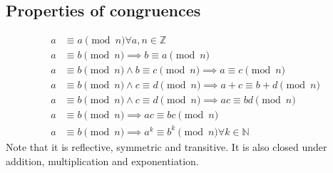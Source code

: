 \documentclass[letterpaper,12pt,oneside]{article}
\begin{document}
\subsection{Properties of congruences}
\begin{align*}
    a & \equiv a \pmod{n} \forall a, n \in \mathbb{Z}                                \\
    a & \equiv b \pmod{n} \implies b \equiv a \pmod{n}                               \\
    a & \equiv b \pmod{n} \land b \equiv c \pmod{n} \implies a \equiv c \pmod{n}     \\
    a & \equiv b \pmod{n} \land c \equiv d \pmod{n} \implies a+c \equiv b+d \pmod{n} \\
    a & \equiv b \pmod{n} \land c \equiv d \pmod{n} \implies ac \equiv bd \pmod{n}   \\
    a & \equiv b \pmod{n} \implies ac \equiv bc \pmod{n}                             \\
    a & \equiv b \pmod{n} \implies a^k \equiv b^k \pmod{n} \forall k \in \mathbb{N}
\end{align*}
Note that it is reflective, symmetric and transitive. It is also closed under addition, multiplication and exponentiation.
\end{document}
